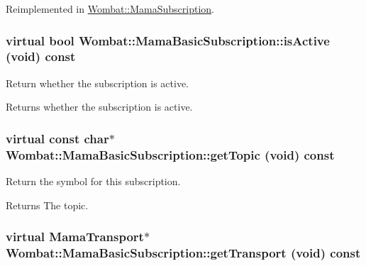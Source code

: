 Reimplemented in \hyperlink{classWombat_1_1MamaSubscription_a2607ec39a0426074664326920a5733f9}{Wombat::MamaSubscription}.\hypertarget{classWombat_1_1MamaBasicSubscription_ad651a6cd62c02a074ad276dbb11ddd4b}{
\subsubsection[{isActive}]{\setlength{\rightskip}{0pt plus 5cm}virtual bool Wombat::MamaBasicSubscription::isActive (void) const}}
\label{classWombat_1_1MamaBasicSubscription_ad651a6cd62c02a074ad276dbb11ddd4b}


Return whether the subscription is active. \begin{DoxyReturn}{Returns}
whether the subscription is active. 
\end{DoxyReturn}
\hypertarget{classWombat_1_1MamaBasicSubscription_acc13b00868fd554476794e43dafa67e9}{
\subsubsection[{getTopic}]{\setlength{\rightskip}{0pt plus 5cm}virtual const char$\ast$ Wombat::MamaBasicSubscription::getTopic (void) const}}
\label{classWombat_1_1MamaBasicSubscription_acc13b00868fd554476794e43dafa67e9}


Return the symbol for this subscription. \begin{DoxyReturn}{Returns}
The topic. 
\end{DoxyReturn}
\hypertarget{classWombat_1_1MamaBasicSubscription_aa2f74c1cb97f84f059a880ddd28ef929}{
\subsubsection[{getTransport}]{\setlength{\rightskip}{0pt plus 5cm}virtual {\bf MamaTransport}$\ast$ Wombat::MamaBasicSubscription::getTransport (void) const}}
\label{classWombat_1_1MamaBasicSubscription_aa2f74c1cb97f84f059a880ddd28ef929}


